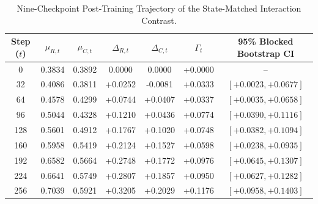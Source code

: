 \begin{table}[t]
\centering
\caption{Nine-Checkpoint Post-Training Trajectory of the State-Matched Interaction Contrast.}
\label{tab:trajectory}
\begin{tabular}{ccccccc}
\toprule
Step ($t$) & $\mu_{R,t}$ & $\mu_{C,t}$ & $\Delta_{R,t}$ & $\Delta_{C,t}$ & $\Gamma_t$ & 95\% Blocked Bootstrap CI \\
\midrule
0   & 0.3834 & 0.3892 & 0.0000 & 0.0000 & +0.0000 & -- \\
32  & 0.4086 & 0.3811 & +0.0252 & -0.0081 & +0.0333 & $[+0.0023, +0.0677]$ \\
64  & 0.4578 & 0.4299 & +0.0744 & +0.0407 & +0.0337 & $[+0.0035, +0.0658]$ \\
96  & 0.5044 & 0.4328 & +0.1210 & +0.0436 & +0.0774 & $[+0.0390, +0.1116]$ \\
128 & 0.5601 & 0.4912 & +0.1767 & +0.1020 & +0.0748 & $[+0.0382, +0.1094]$ \\
160 & 0.5958 & 0.5419 & +0.2124 & +0.1527 & +0.0598 & $[+0.0238, +0.0935]$ \\
192 & 0.6582 & 0.5664 & +0.2748 & +0.1772 & +0.0976 & $[+0.0645, +0.1307]$ \\
224 & 0.6641 & 0.5749 & +0.2807 & +0.1857 & +0.0950 & $[+0.0627, +0.1282]$ \\
256 & 0.7039 & 0.5921 & +0.3205 & +0.2029 & +0.1176 & $[+0.0958, +0.1403]$ \\
\bottomrule
\end{tabular}
\end{table}
